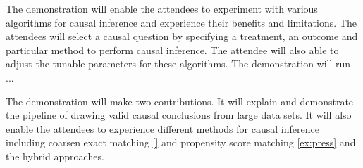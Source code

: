 \vspace{-2mm}

The demonstration will enable the attendees to experiment with various algorithms for causal inference and experience their benefits and limitations. The attendees will select a causal question by specifying a treatment, an outcome and particular method to perform causal inference. The attendee will also able to adjust the tunable parameters for these algorithms. The demonstration will run ...

The demonstration will make two contributions. It will explain and demonstrate the pipeline 
of drawing valid causal conclusions from large data sets. It will also enable the attendees to 
experience different methods for causal inference including coarsen exact matching \ref{} and propensity score matching \ref{ex:press} and the hybrid approaches.


